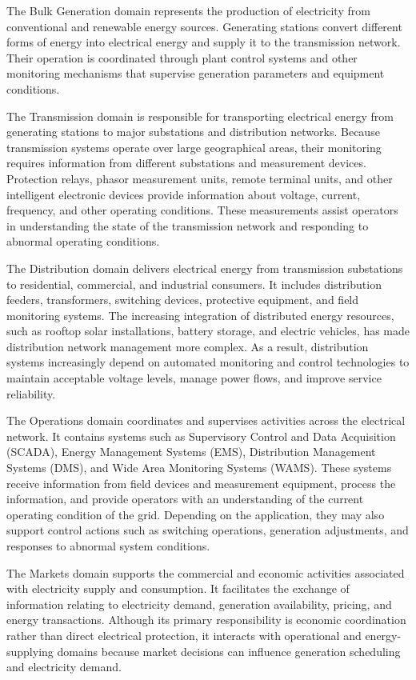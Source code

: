 \documentclass[12pt,a4paper]{report}
\begin{document}
The Bulk Generation domain represents the production of electricity from conventional and
renewable energy sources. Generating stations convert different forms of energy into electrical
energy and supply it to the transmission network. Their operation is coordinated through plant
control systems and other monitoring mechanisms that supervise generation parameters and
equipment conditions.

The Transmission domain is responsible for transporting electrical energy from generating stations
to major substations and distribution networks. Because transmission systems operate over large
geographical areas, their monitoring requires information from different substations and
measurement devices. Protection relays, phasor measurement units, remote terminal units, and
other intelligent electronic devices provide information about voltage, current, frequency, and
other operating conditions. These measurements assist operators in understanding the state of
the transmission network and responding to abnormal operating conditions.

The Distribution domain delivers electrical energy from transmission substations to residential,
commercial, and industrial consumers. It includes distribution feeders, transformers, switching
devices, protective equipment, and field monitoring systems. The increasing integration of
distributed energy resources, such as rooftop solar installations, battery storage, and electric
vehicles, has made distribution network management more complex. As a result, distribution systems
increasingly depend on automated monitoring and control technologies to maintain acceptable
voltage levels, manage power flows, and improve service reliability.

The Operations domain coordinates and supervises activities across the electrical network.
It contains systems such as Supervisory Control and Data Acquisition (SCADA), Energy Management
Systems (EMS), Distribution Management Systems (DMS), and Wide Area Monitoring Systems (WAMS).
These systems receive information from field devices and measurement equipment, process the
information, and provide operators with an understanding of the current operating condition of
the grid. Depending on the application, they may also support control actions such as switching
operations, generation adjustments, and responses to abnormal system conditions.

The Markets domain supports the commercial and economic activities associated with electricity
supply and consumption. It facilitates the exchange of information relating to electricity
demand, generation availability, pricing, and energy transactions. Although its primary
responsibility is economic coordination rather than direct electrical protection, it interacts
with operational and energy-supplying domains because market decisions can influence generation
scheduling and electricity demand.
\end{document}
